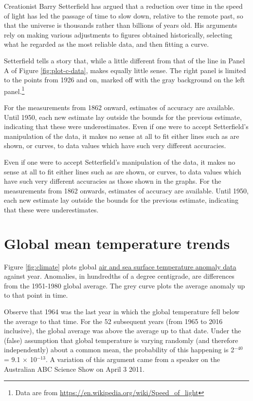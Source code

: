 \documentclass[
  10pt,
  b5paper]{book}
\begin{document}
Creationist Barry Setterfield has argued that a reduction over
time in the speed of light has led the passage of time to slow
down, relative to the remote past, so that the universe is
thousands rather than billions of years old. His arguments rely
on making various adjustments to figures obtained historically,
selecting what he regarded as the most reliable data, and
then fitting a curve.

Setterfield tells a story that, while a little different from that of
the line in Panel A of Figure \ref{fig:plot-c-data}, makes equally
little sense. The right panel is limited to the points from 1926
and on, marked off with the gray background on the left panel.\footnote{Data
  are from \url{https://en.wikipedia.org/wiki/Speed_of_light}}

For the measurements from 1862 onward, estimates of accuracy
are available. Until 1950, each new estimate lay outside the
bounds for the previous estimate, indicating that these
were underestimates.
Even if one were to accept Setterfield's manipulation of the data,
it makes no sense at all to fit either lines such as are shown, or
curves, to data values which have such very different
accuracies.

Even if one were to accept Setterfield's manipulation of the data,
it makes no sense at all to fit either lines such as are shown, or
curves, to data values which have such very different
accuracies as those shown in the graphs. For the
measurements from 1862 onwards, estimates of accuracy are
available. Until 1950, each new estimate lay outside the
bounds for the previous estimate, indicating that these
were underestimates.

\hypertarget{global-mean-temperature-trends}{%
\section{Global mean temperature trends}\label{global-mean-temperature-trends}}

Figure \ref{fig:climate} plots global
\href{http://iridl.ldeo.columbia.edu/SOURCES/.NASA/.GISS/.GISSTEMP/.Global/.LOTI/}{air and sea surface temperature anomaly data}
against year. Anomalies, in hundredths of a degree centigrade, are
differences from the 1951-1980 global average. The grey curve plots
the average anomaly up to that point in time.

Observe that 1964 was the last year in which the global
temperature fell below the average to that time.
For the 52 subsequent years (from 1965 to 2016 inclusive),
the global average was above the average up to that date. Under
the (false) assumption that global temperature is varying
randomly (and therefore independently) about a common mean,
the probability of this happening is 2\(^{-40}\) = 9.1
\(\times\) 10\(^{-13}\). A variation of this argument came
from a speaker on the Australian ABC Science Show on April
3 2011.
\end{document}

